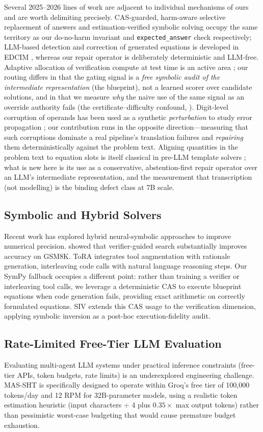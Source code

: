 \documentclass[11pt,a4paper]{article}
\begin{document}
Several 2025--2026 lines of work are adjacent to individual mechanisms of ours and are worth delimiting precisely.
CAS-guarded, harm-aware selective replacement of answers \citep{guardedrepair2026} and estimation-verified symbolic solving \citep{evoss2025} occupy the same territory as our do-no-harm invariant and \texttt{expected\_answer} check respectively; LLM-based detection and correction of generated equations is developed in EDCIM \citep{edcim2025}, whereas our repair operator is deliberately deterministic and LLM-free.
Adaptive allocation of verification compute at test time is an active area \citep{qu2026adaptive}; our routing differs in that the gating signal is a \emph{free symbolic audit of the intermediate representation} (the blueprint), not a learned scorer over candidate solutions, and in that we measure \emph{why} the naive use of the same signal as an override authority fails (the certificate--difficulty confound, ).
Digit-level corruption of operands has been used as a synthetic \emph{perturbation} to study error propagation \citep{misinfoprop2025}; our contribution runs in the opposite direction---measuring that such corruptions dominate a real pipeline's translation failures and \emph{repairing} them deterministically against the problem text.
Aligning quantities in the problem text to equation slots is itself classical in pre-LLM template solvers \citep{kushman2014learning}; what is new here is its use as a conservative, abstention-first repair operator over an LLM's intermediate representation, and the measurement that transcription (not modelling) is the binding defect class at 7B scale.
\subsection{Symbolic and Hybrid Solvers}
Recent work has explored hybrid neural-symbolic approaches to improve numerical precision.
\citet{cobbe2021gsm8k} showed that verifier-guided search substantially improves accuracy on GSM8K.
ToRA \citep{gou2023tora} integrates tool augmentation with rationale generation, interleaving code calls with natural language reasoning steps.
Our SymPy fallback occupies a different point: rather than training a verifier or interleaving tool calls, we leverage a deterministic CAS to execute blueprint equations when code generation fails, providing exact arithmetic on correctly formulated equations.
SIV extends this CAS usage to the verification dimension, applying symbolic inversion as a post-hoc execution-fidelity audit.
\subsection{Rate-Limited Free-Tier LLM Evaluation}
Evaluating multi-agent LLM systems under practical inference constraints (free-tier APIs, token budgets, rate limits) is an underexplored engineering challenge.
MAS-SHT is specifically designed to operate within Groq's free tier of 100,000 tokens/day and 12 RPM for 32B-parameter models, using a realistic token estimation heuristic (input characters $\div$ 4 plus $0.35\times$ max output tokens) rather than pessimistic worst-case budgeting that would cause premature budget exhaustion.
\end{document}
